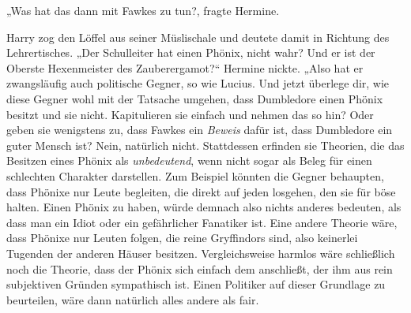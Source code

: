 „Was hat das dann mit Fawkes zu tun?, fragte Hermine.

Harry zog den Löffel aus seiner Müslischale und deutete damit in Richtung des Lehrertisches. „Der Schulleiter hat einen Phönix, nicht wahr? Und er ist der Oberste Hexenmeister des Zauberergamot?“ Hermine nickte.
%
„Also hat er zwangsläufig auch politische Gegner, so wie Lucius. Und jetzt überlege dir, wie diese Gegner wohl mit der Tatsache umgehen, dass Dumbledore einen Phönix besitzt und sie nicht. Kapitulieren sie einfach und nehmen das so hin? Oder geben sie wenigstens zu, dass Fawkes ein \emph{Beweis} dafür ist, dass Dumbledore ein guter Mensch ist? Nein, natürlich nicht. Stattdessen erfinden sie Theorien, die das Besitzen eines Phönix als \emph{unbedeutend}, wenn nicht sogar als Beleg für einen schlechten Charakter darstellen.
%
Zum Beispiel könnten die Gegner behaupten, dass Phönixe nur Leute begleiten, die direkt auf jeden losgehen, den sie für böse halten. Einen Phönix zu haben, würde demnach also nichts anderes bedeuten, als dass man ein Idiot oder ein gefährlicher Fanatiker ist. Eine andere Theorie wäre, dass Phönixe nur Leuten folgen, die reine Gryffindors sind, also keinerlei Tugenden der anderen Häuser besitzen. Vergleichsweise harmlos wäre schließlich noch die Theorie, dass der Phönix sich einfach dem anschließt, der ihm aus rein subjektiven Gründen sympathisch ist. Einen Politiker auf dieser Grundlage zu beurteilen, wäre dann natürlich alles andere als fair.
